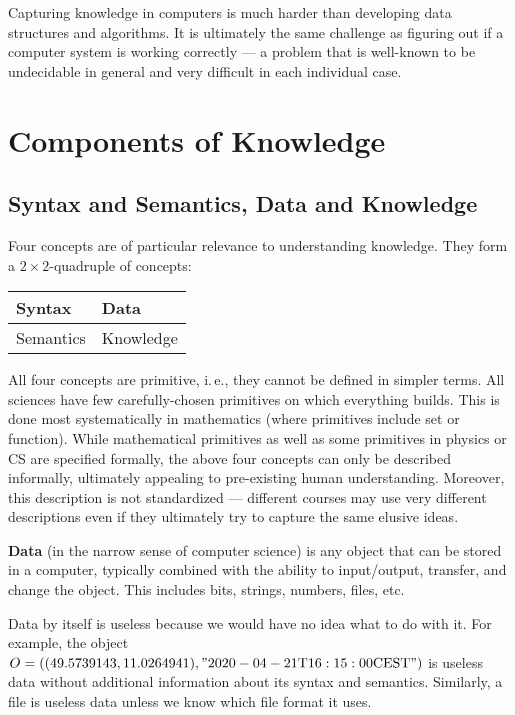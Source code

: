 Capturing knowledge in computers is much harder than developing data structures and algorithms.
It is ultimately the same challenge as figuring out if a computer system is working correctly --- a problem that is well-known to be undecidable in general and very difficult in each individual case.

\section{Components of Knowledge}

\subsection{Syntax and Semantics, Data and Knowledge}

Four concepts are of particular relevance to understanding knowledge.
They form a $2\times 2$-quadruple of concepts:

\begin{center}
\begin{tabular}{l|l}
Syntax & Data \\
\hline
Semantics & Knowledge
\end{tabular}
\end{center}

All four concepts are primitive, i.\,e., they cannot be defined in simpler terms.
All sciences have few carefully-chosen primitives on which everything builds.
This is done most systematically in mathematics (where primitives include set or function).
While mathematical primitives as well as some primitives in physics or CS are specified formally, the above four concepts can only be described informally, ultimately appealing to pre-existing human understanding.
Moreover, this description is not standardized --- different courses may use very different descriptions even if they ultimately try to capture the same elusive ideas.

\textbf{Data} (in the narrow sense of computer science) is any object that can be stored in a computer, typically combined with the ability to input/output, transfer, and change the object.
This includes bits, strings, numbers, files, etc.

Data by itself is useless because we would have no idea what to do with it.
For example, the object $O=((49.5739143, 11.0264941), "2020-04-21\text{T}16:15:00\text{CEST}")$ is useless data without additional information about its syntax and semantics.
Similarly, a file is useless data unless we know which file format it uses.

